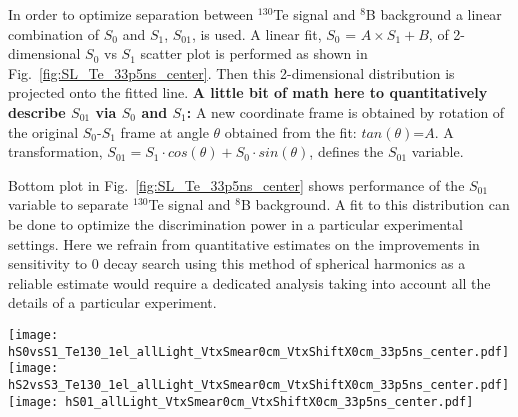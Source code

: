 In order to optimize separation between $^{130}$Te signal and $^{8}$B
background a linear combination of $S_0$ and $S_1$, $S_{01}$, is
used. A linear fit, $S_0$ = $A \times S_1 + B$, of 2-dimensional $S_0$
vs $S_1$ scatter plot is performed as shown in
Fig.~\ref{fig:SL_Te_33p5ns_center}. Then this 2-dimensional
distribution is projected onto the fitted line. {\bf A little bit of
  math here to quantitatively describe $S_{01}$ via $S_0$ and $S_1$:}
A new coordinate frame is obtained by rotation of the original
$S_0$-$S_1$ frame at angle $\theta$ obtained from the fit:
$tan(\theta)$=$A$. A transformation, $S_{01} = S_1 \cdot cos(\theta) +
S_0 \cdot sin(\theta)$, defines the $S_{01}$ variable.

Bottom plot in Fig.~\ref{fig:SL_Te_33p5ns_center} shows performance of
the $S_{01}$ variable to separate $^{130}$Te signal and $^{8}$B
background. A fit to this distribution can be done to optimize the
discrimination power in a particular experimental settings. Here we
refrain from quantitative estimates on the improvements in sensitivity
to 0{\nbb} decay search using this method of spherical harmonics as a
reliable estimate would require a dedicated analysis taking into
account all the details of a particular experiment.

\begin{figure*}[h]
  \centering
  \texttt{[image: hS0vsS1\_Te130\_1el\_allLight\_VtxSmear0cm\_VtxShiftX0cm\_33p5ns\_center.pdf]}
  \texttt{[image: hS2vsS3\_Te130\_1el\_allLight\_VtxSmear0cm\_VtxShiftX0cm\_33p5ns\_center.pdf]}
  \texttt{[image: hS01\_allLight\_VtxSmear0cm\_VtxShiftX0cm\_33p5ns\_center.pdf]}
  \caption{Spherical harmonics comparison between $^{130}$Te 0{\nbb}
    decay signal ($Q=2.529$~MeV) (\emph{red}) and $^{8}$B solar
    neutrinos background (\emph{blue}) for 1000 simulated events
    originated at the center of the sphere. $^{8}$B events are
    implemented as 2.529~MeV electrons with initial direction along
    $x$-axis. Perfect vertex reconstruction - true vertex position is
    used. Time cut of 33.5~ns on the photon arrival time is
    applied. \emph{Top left:} $S_0$ versus $S_1$ scatter plot. Black
    dotted line is a linear fit of these 2D histograms. Variable
    $S_{01}$ is defined as a projection of 2D distribution onto this
    linear fit. \emph{Top right:} $S_2$ versus $S_3$ scatter
    plot. \emph{Bottom:} $S_{01}$ distribution for the signal and
    background.}
\label{fig:SL_Te_33p5ns_center}
\end{figure*}


